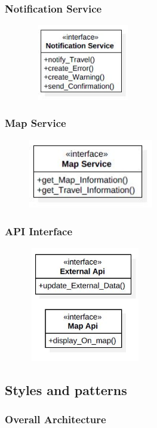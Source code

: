 \documentclass [12pt]{article}
\begin{document}
\subsubsection{Notification Service}
\begin{figure}[ht!]
\centering
\includegraphics[height=3.3cm, width=4.8cm]{Int5.jpg}
\end{figure}
\subsubsection{Map Service}
\begin{figure}[ht!]
\centering
\includegraphics[height=3.0cm, width=5.5cm]{Int6.jpg}
\end{figure}
\subsubsection{API Interface}
\begin{figure}[ht!]
\centering
\includegraphics[height=5cm, width=5cm]{Int7.jpg}
\end{figure}


\subsection{Styles and patterns}
\subsubsection{Overall Architecture}
\end{document}
